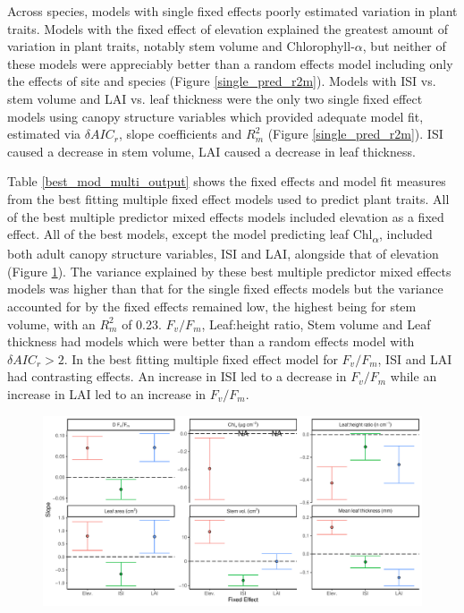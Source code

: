 \documentclass[a4paper, 11pt]{article}
\begin{document}
Across species, models with single fixed effects poorly estimated variation in plant traits. Models with the fixed effect of elevation explained the greatest amount of variation in plant traits, notably stem volume and Chlorophyll-$\alpha$, but neither of these models were appreciably better than a random effects model including only the effects of site and species (Figure \ref{single_pred_r2m}). Models with ISI vs. stem volume and LAI vs. leaf thickness were the only two single fixed effect models using canopy structure variables which provided adequate model fit, estimated via $\delta{}AIC_r$, slope coefficients and $R^2_m$ (Figure \ref{single_pred_r2m}). ISI caused a decrease in stem volume, LAI caused a decrease in leaf thickness.

Table \ref{best_mod_multi_output} shows the fixed effects and model fit measures from the best fitting multiple fixed effect models used to predict plant traits. All of the best multiple predictor mixed effects models included elevation as a fixed effect. All of the best models, except the model predicting leaf Chl\textsubscript{$\alpha$}, included both adult canopy structure variables, ISI and LAI, alongside that of elevation (Figure \ref{multi_pred_slope}). The variance explained by these best multiple predictor mixed effects models was higher than that for the single fixed effects models but the variance accounted for by the fixed effects remained low, the highest being for stem volume, with an $R^2_m$ of 0.23. $F_v/F_m$, Leaf:height ratio, Stem volume and Leaf thickness had models which were better than a random effects model with $\delta{}AIC_r > 2$. In the best fitting multiple fixed effect model for $F_v/F_m$, ISI and LAI had contrasting effects. An increase in ISI led to a decrease in $F_v/F_m$ while an increase in LAI led to an increase in $F_v/F_m$. 

\begin{figure}[H]
\includegraphics[width=\textwidth]{multi_pred_slope}
\centering
\caption{}
\label{multi_pred_slope}
\end{figure}
\end{document}
